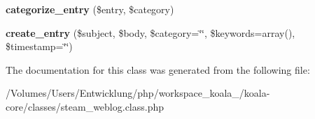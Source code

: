 \begin{DoxyCompactItemize}
\item 
\hypertarget{classsteam__weblog_ae4378d3f21f3f35d5365501cc37576c2}{
{\bfseries categorize\_\-entry} (\$entry, \$category)}
\label{classsteam__weblog_ae4378d3f21f3f35d5365501cc37576c2}

\item 
\hypertarget{classsteam__weblog_ac986886d06073f15ed400d06c83279c1}{
{\bfseries create\_\-entry} (\$subject, \$body, \$category=\char`\"{}\char`\"{}, \$keywords=array(), \$timestamp=\char`\"{}\char`\"{})}
\label{classsteam__weblog_ac986886d06073f15ed400d06c83279c1}

\end{DoxyCompactItemize}


The documentation for this class was generated from the following file:\begin{DoxyCompactItemize}
\item 
/Volumes/Users/Entwicklung/php/workspace\_\-koala\_/koala-\/core/classes/steam\_\-weblog.class.php\end{DoxyCompactItemize}
